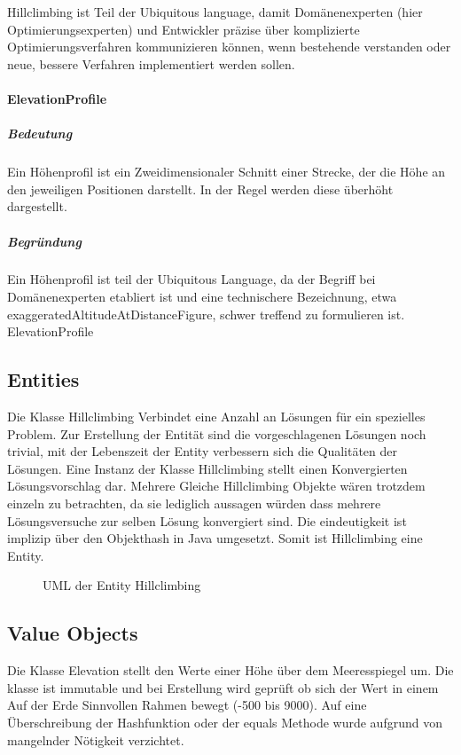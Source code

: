 Hillclimbing ist Teil der Ubiquitous language, damit Domänenexperten (hier Optimierungsexperten) und Entwickler präzise über komplizierte Optimierungsverfahren kommunizieren können, wenn bestehende verstanden oder neue, bessere Verfahren implementiert werden sollen.

\paragraph{ElevationProfile}

\subparagraph{Bedeutung}

Ein Höhenprofil ist ein Zweidimensionaler Schnitt einer Strecke, der die Höhe an den jeweiligen Positionen darstellt. In der Regel werden diese überhöht dargestellt.

\subparagraph{Begründung}

Ein Höhenprofil ist teil der Ubiquitous Language, da der Begriff bei Domänenexperten etabliert ist und eine technischere Bezeichnung, etwa exaggeratedAltitudeAtDistanceFigure, schwer treffend zu formulieren ist.
ElevationProfile

\subsection{Entities}

Die Klasse Hillclimbing Verbindet eine Anzahl an Lösungen für ein spezielles Problem. 
Zur Erstellung der Entität sind die vorgeschlagenen Lösungen noch trivial, mit der Lebenszeit der Entity verbessern sich die Qualitäten der Lösungen. Eine Instanz der Klasse Hillclimbing stellt einen Konvergierten Lösungsvorschlag dar. Mehrere Gleiche Hillclimbing Objekte wären trotzdem einzeln zu betrachten, da sie lediglich aussagen würden dass mehrere Lösungsversuche zur selben Lösung konvergiert sind. Die eindeutigkeit ist implizip über den Objekthash in Java umgesetzt.
Somit ist Hillclimbing eine Entity.

\begin{figure}[H]
  \centering
  
  \caption{UML der Entity Hillclimbing}
\end{figure}

\subsection{Value Objects}

Die Klasse Elevation stellt den Werte einer Höhe über dem Meeresspiegel um. Die klasse ist immutable und bei Erstellung wird geprüft ob sich der Wert in einem Auf der Erde Sinnvollen Rahmen bewegt (-500 bis 9000). 
Auf eine Überschreibung der Hashfunktion oder der equals Methode wurde aufgrund von mangelnder Nötigkeit verzichtet.


